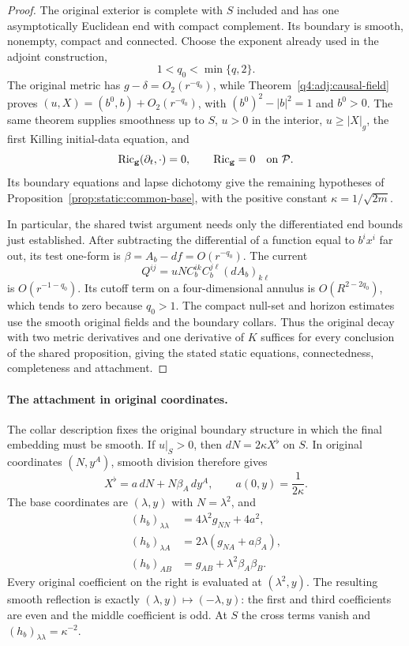 \begin{proof}
The original exterior is complete with $S$ included and has one
asymptotically Euclidean end with compact complement. Its boundary is
smooth, nonempty, compact and connected. Choose the exponent already
used in the adjoint construction,
\[
 1<q_0<\min\{q,2\}.
\]
The original metric has $g-\delta=O_2(r^{-q_0})$, while
Theorem~\ref{q4:adj:causal-field} proves
$(u,X)=(b^0,b)+O_2(r^{-q_0})$, with
$(b^0)^2-|b|^2=1$ and $b^0>0$. The same theorem supplies smoothness up
to $S$, $u>0$ in the interior, $u\ge|X|_g$, the first Killing initial-data
equation, and
\[
 \operatorname{Ric}_{\mathbf g}(\partial_t,\cdot)=0,
 \qquad \operatorname{Ric}_{\mathbf g}=0\quad\hbox{on }\mathcal P.
\]
Its boundary equations and lapse dichotomy give the remaining hypotheses
of Proposition~\ref{prop:static:common-base}, with the positive constant
$\kappa=1/\sqrt{2m}$.

In particular, the shared twist argument needs only the differentiated
end bounds just established. After subtracting the differential of a
function equal to $b^ix^i$ far out, its test one-form is
$\beta=A_b-df=O(r^{-q_0})$. The current
\[
 Q^{ij}=uN C_b^{ik}C_b^{j\ell}(dA_b)_{k\ell}
\]
is $O(r^{-1-q_0})$. Its cutoff term on a four-dimensional annulus is
$O(R^{2-2q_0})$, which tends to zero because $q_0>1$. The compact null-set
and horizon estimates use the smooth original fields and the boundary
collars. Thus the original decay with two metric derivatives and one
derivative of $K$ suffices for every conclusion of the shared proposition,
giving the stated static equations, connectedness, completeness and attachment.
\end{proof}

\paragraph{The attachment in original coordinates.}
The collar description fixes the original boundary structure in which
the final embedding must be smooth. If $u|_S>0$, then
$dN=2\kappa X^\flat$ on $S$. In original coordinates $(N,y^A)$, smooth
division therefore gives
\[
 X^\flat=a\,dN+N\beta_A\,dy^A,
 \qquad a(0,y)=\frac1{2\kappa}.
\]
The base coordinates are $(\lambda,y)$ with $N=\lambda^2$, and
\begin{equation}\label{q4:sta:positive-lapse-base-collar}
 \begin{split}
 (h_b)_{\lambda\lambda}&=4\lambda^2g_{NN}+4a^2,\\
 (h_b)_{\lambda A}&=2\lambda(g_{NA}+a\beta_A),\\
 (h_b)_{AB}&=g_{AB}+\lambda^2\beta_A\beta_B.
 \end{split}
\end{equation}
Every original coefficient on the right is evaluated at $(\lambda^2,y)$.
The resulting smooth reflection is exactly
$(\lambda,y)\mapsto(-\lambda,y)$: the first and third coefficients are
even and the middle coefficient is odd. At $S$ the cross terms vanish
and $(h_b)_{\lambda\lambda}=\kappa^{-2}$.

